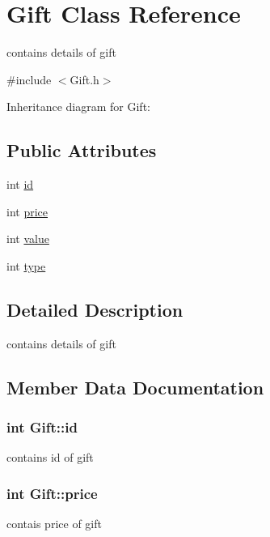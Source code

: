 \hypertarget{classGift}{}\section{Gift Class Reference}
\label{classGift}


contains details of gift  




{\ttfamily \#include $<$Gift.\+h$>$}



Inheritance diagram for Gift\+:
\subsection*{Public Attributes}
\begin{DoxyCompactItemize}
\item 
int \hyperlink{classGift_a145f971b2591cd6a363d4602c33d5d91}{id}
\item 
int \hyperlink{classGift_ad795362f286e8d5d73514fb64ac478b8}{price}
\item 
int \hyperlink{classGift_a71d14b92ebfd06993afe584f088bc748}{value}
\item 
int \hyperlink{classGift_a63fb63fdc6f0821417039da90a54ad4c}{type}
\end{DoxyCompactItemize}


\subsection{Detailed Description}
contains details of gift 

\subsection{Member Data Documentation}
\subsubsection[{\texorpdfstring{id}{id}}]{\setlength{\rightskip}{0pt plus 5cm}int Gift\+::id}\hypertarget{classGift_a145f971b2591cd6a363d4602c33d5d91}{}\label{classGift_a145f971b2591cd6a363d4602c33d5d91}
contains id of gift 
\subsubsection[{\texorpdfstring{price}{price}}]{\setlength{\rightskip}{0pt plus 5cm}int Gift\+::price}\hypertarget{classGift_ad795362f286e8d5d73514fb64ac478b8}{}\label{classGift_ad795362f286e8d5d73514fb64ac478b8}
contais price of gift 
